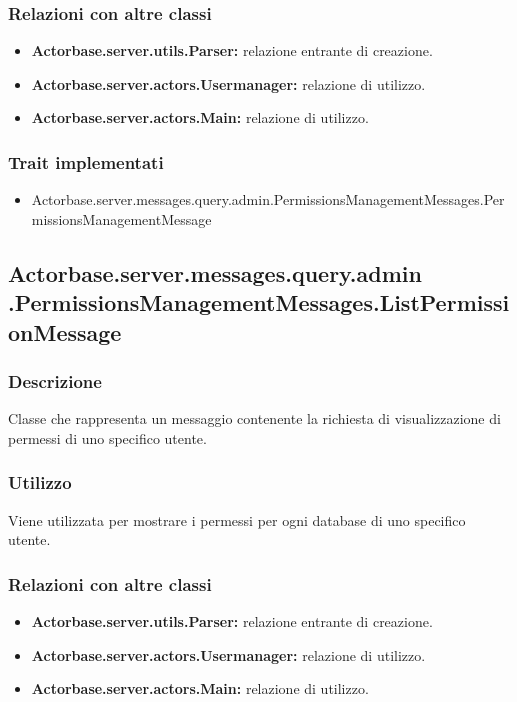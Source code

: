 \documentclass[a4paper]{article}
\begin{document}
			\subsubsection{Relazioni con altre classi}
				\begin{itemize}
					\item \textbf{Actorbase.server.utils.Parser:} relazione entrante di creazione.
					\item \textbf{Actorbase.server.actors.Usermanager:} relazione di utilizzo.
					\item \textbf{Actorbase.server.actors.Main:} relazione di utilizzo.
				\end{itemize}
			\subsubsection{Trait implementati}
				\begin{itemize}
					\item Actorbase.server.messages.query.admin.PermissionsManagementMessages.PermissionsManagementMessage
				\end{itemize}
				
		\subsection{Actorbase.server.messages.query.admin \newline
		.PermissionsManagementMessages.ListPermissionMessage}
			\subsubsection{Descrizione}
				Classe che rappresenta un messaggio contenente la richiesta di visualizzazione di permessi di uno specifico utente.
				
			\subsubsection{Utilizzo}
				Viene utilizzata per mostrare i  permessi per ogni database di uno specifico utente.
				
			\subsubsection{Relazioni con altre classi}
				\begin{itemize}
					\item \textbf{Actorbase.server.utils.Parser:} relazione entrante di creazione.
					\item \textbf{Actorbase.server.actors.Usermanager:} relazione di utilizzo.
					\item \textbf{Actorbase.server.actors.Main:} relazione di utilizzo.
				\end{itemize}
\end{document}
